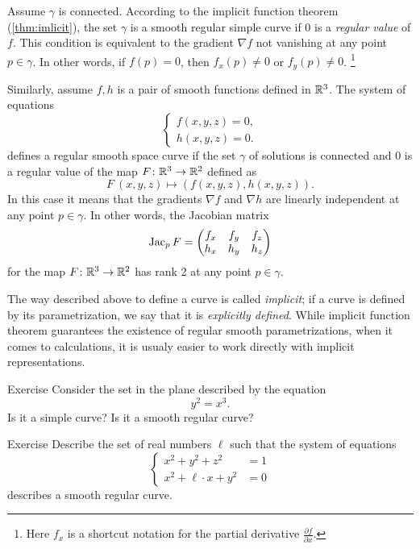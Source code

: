 Assume $\gamma$ is connected.
According to the implicit function theorem (\ref{thm:imlicit}), the set $\gamma$ is a smooth regular simple curve if $0$ is a \emph{regular value} of $f$.
This condition is equivalent to the gradient $\nabla f$ not vanishing at any point $p\in \gamma$.
In other words, if $f(p)=0$, then   
$f_x(p)\ne 0$ or $f_y(p)\ne 0$.%
\footnote{Here $f_x$ is a shortcut notation for the partial derivative
$\tfrac{\partial f}{\partial x}$.}

Similarly, assume $f,h$ is a pair of smooth functions defined in $\mathbb{R}^3$.
The system of equations
\[\begin{cases}
   f(x,y,z)=0,
   \\
   h(x,y,z)=0.
  \end{cases}
\]
defines a regular smooth space curve if the set $\gamma$ of solutions is connected and $0$ is a regular value of the map $F\colon\mathbb{R}^3\to\mathbb{R}^2$ defined as
\[F\:(x,y,z)\mapsto (f(x,y,z),h(x,y,z)).\]
In this case it means that the gradients $\nabla f$ and $\nabla h$ are linearly independent at any point $p\in \gamma$.
In other words, the Jacobian matrix
\[
\mathop{\rm Jac}\nolimits_pF=\begin{pmatrix}
f_x&f_y&f_z\\
h_x&h_y&h_z
\end{pmatrix}
\]
for the map $F\colon\mathbb{R}^3\to\mathbb{R}^2$ has rank 2 at any point $p \in \gamma$.

The way described above to define a curve is called \emph{implicit};
if a curve is defined by its parametrization, we say that it is \emph{explicitly defined}.
While implicit function theorem guarantees the existence of regular smooth parametrizations,
when it comes to calculations, it is usualy easier to work directly with implicit representations. 

\begin{thm}{Exercise}\label{ex:y^2=x^3}
Consider the set in the plane described by the equation
\[y^2=x^3.\]
Is it a simple curve?
Is it a smooth regular curve?
\end{thm}

\begin{thm}{Exercise}\label{ex:viviani}
Describe the set of real numbers $\ell$
such that the system of equations
\[\begin{cases}
x^2+y^2+z^2&=1
\\
x^2+\ell\cdot x+y^2&=0
\end{cases}\]
describes a smooth regular curve.
\end{thm}

